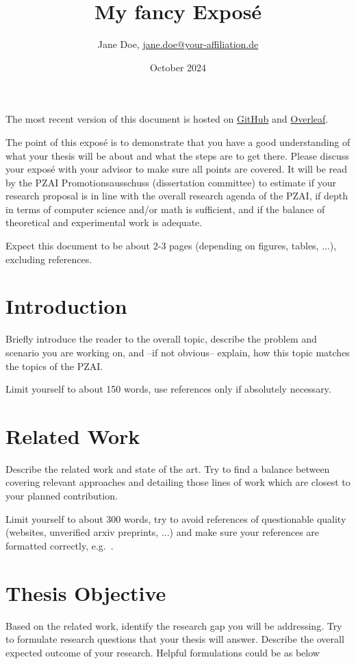 \documentclass[11pt,DIV=16,parskip=half]{scrartcl}
\title{My fancy Exposé}
\author{Jane Doe, \href{mailto:jane.doe@your-affiliation.de}{jane.doe@your-affiliation.de}}
\date{October 2024}
\begin{document}
\maketitle

The most recent version of this document is hosted on \href{https://github.com/th-nuernberg/pzai-expose}{GitHub} and \href{https://www.overleaf.com/read/ctgdqqhnpksb#2bc10c}{Overleaf}.

The point of this exposé is to demonstrate that you have a good understanding of what your thesis will be about and what the steps are to get there.
Please discuss your exposé with your advisor to make sure all points are covered.
It will be read by the PZAI Promotionsausschuss (dissertation committee) to estimate if your research proposal is in line with the overall research agenda of the PZAI, if depth in terms of computer science and/or math is sufficient, and if the balance of theoretical and experimental work is adequate.

Expect this document to be about 2-3 pages (depending on figures, tables, ...), excluding references.


\section{Introduction}
Briefly introduce the reader to the overall topic, describe the problem and scenario you are working on, and --if not obvious-- explain, how this topic matches the topics of the PZAI.

Limit yourself to about 150 words, use references only if absolutely necessary.



\section{Related Work}
Describe the related work and state of the art.
Try to find a balance between covering relevant approaches and detailing those lines of work which are closest to your planned contribution.

Limit yourself to about 300 words, try to avoid references of questionable quality (websites, unverified arxiv preprints, ...) and make sure your references are formatted correctly, e.g.~\cite{cooley1965-fft}.



\section{Thesis Objective}
Based on the related work, identify the research gap you will be addressing.
Try to formulate research questions that your thesis will answer.
Describe the overall expected outcome of your research.
Helpful formulations could be as below
\end{document}
